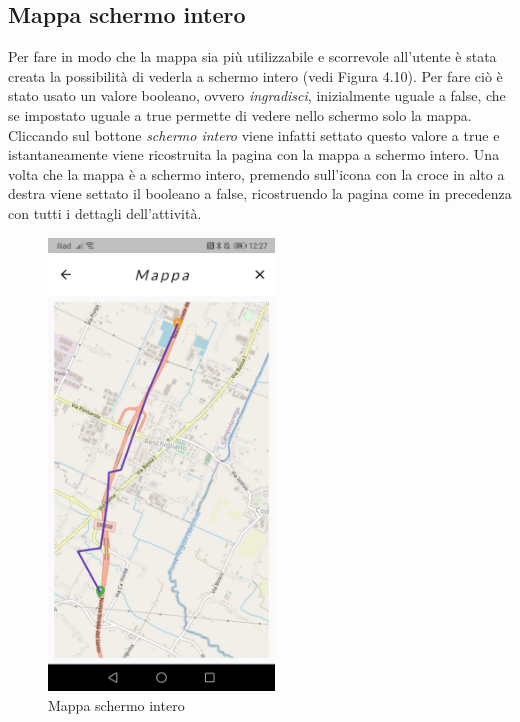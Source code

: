 \newpage

\subsection{Mappa schermo intero}
Per fare in modo che la mappa sia più utilizzabile e scorrevole all'utente è stata creata la possibilità di vederla a schermo intero (vedi Figura 4.10).
Per fare ciò è stato usato un valore booleano, ovvero \textit{ingradisci}, inizialmente uguale a false, che se impostato uguale a true permette di vedere nello schermo solo la mappa.
Cliccando sul bottone \textit{schermo intero} viene infatti settato questo valore a true e istantaneamente viene ricostruita la pagina con la mappa a schermo intero.
Una volta che la mappa è a schermo intero, premendo sull'icona con la croce in alto a destra viene settato il booleano a false, ricostruendo la pagina come in precedenza con tutti i dettagli dell'attività.\\

\begin{figure}[htbp]	
	\centering
	\includegraphics[width=6cm]{immagini/mappaintero.jpeg}
	\caption{Mappa schermo intero}
	\label{fig:Mappa schermo intero}
\end{figure}

\newpage

